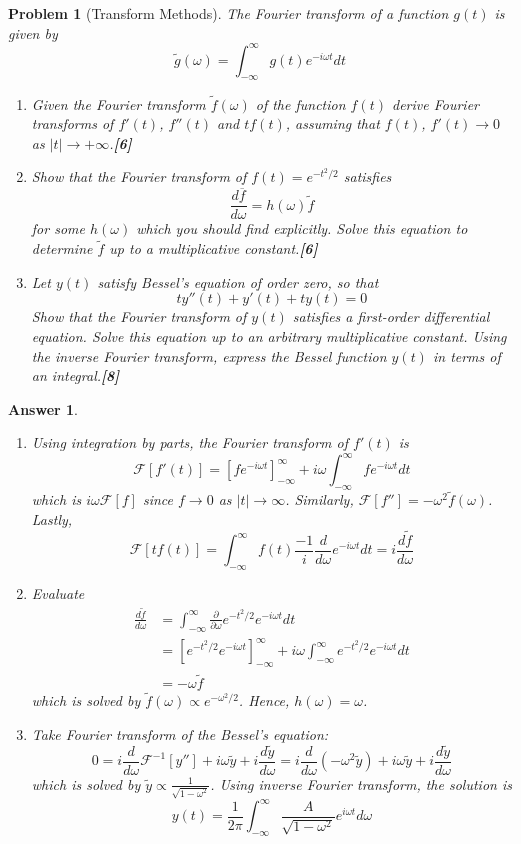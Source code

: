 \documentclass[a4paper]{article}
\newtheorem{ans}{Answer}[section]
\theoremstyle{new}
\newtheorem{qns}{Problem}[section]
\begin{document}
\begin{qns}[Transform Methods]
The Fourier transform of a function $g(t)$ is given by
$$\tilde{g}(\omega)=\int_{-\infty}^\infty g(t)e^{-i\omega t}dt$$
\begin{enumerate}[label=(\alph*)]
\item Given the Fourier transform $\tilde{f}(\omega)$ of the function $f(t)$ derive Fourier transforms of $f'(t)$, $f''(t)$ and $tf(t)$, assuming that $f(t)$, $f'(t)\rightarrow 0$ as $|t|\rightarrow+\infty$.\hfill\textbf{[6]}
\item Show that the Fourier transform of $f(t)=e^{-t^2/2}$ satisfies
$$\frac{d\overline{f}}{d\omega}=h(\omega)\tilde{f}$$
for some $h(\omega)$ which you should find explicitly. Solve this equation to determine $\tilde{f}$ up to a multiplicative constant.\hfill\textbf{[6]}
\item Let $y(t)$ satisfy Bessel’s equation of order zero, so that
$$ty''(t)+y'(t)+ty(t)=0$$
Show that the Fourier transform of $y(t)$ satisfies a first-order differential equation. Solve this equation up to an arbitrary multiplicative constant. Using the inverse Fourier transform, express the Bessel function $y(t)$ in terms of an integral.\hfill\textbf{[8]}
\end{enumerate}
\end{qns}
\begin{ans}\leavevmode
\begin{enumerate}[label=(\alph*)]
\item Using integration by parts, the Fourier transform of $f'(t)$ is
$$\mathcal{F}[f'(t)]=[fe^{-i\omega t}]_{-\infty}^\infty+i\omega\int_{-\infty}^\infty fe^{-i\omega t}dt$$
which is $i\omega\mathcal{F}[f]$ since $f\rightarrow 0$ as $|t|\rightarrow\infty$. Similarly, $\mathcal{F}[f'']=-\omega^2\tilde{f}(\omega)$. Lastly,
$$\mathcal{F}[tf(t)]=\int_{-\infty}^\infty f(t)\frac{-1}{i}\frac{d}{d\omega}e^{-i\omega t}dt=i\frac{d\tilde{f}}{d\omega}$$
\item Evaluate
\begin{align}
    \frac{d\tilde{f}}{d\omega}&=\int_{-\infty}^\infty\frac{\partial}{\partial\omega}e^{-t^2/2}e^{-i\omega t}dt\nonumber\\&=[e^{-t^2/2}e^{-i\omega t}]_{-\infty}^\infty +i\omega\int_{-\infty}^\infty e^{-t^2/2}e^{-i\omega t}dt\nonumber\\&=-\omega\tilde{f}\nonumber
\end{align}
which is solved by $\tilde{f}(\omega)\propto e^{-\omega^2/2}$. Hence, $h(\omega)=\omega$.
\item Take Fourier transform of the Bessel's equation:
$$0=i\frac{d}{d\omega}\mathcal{F}^{-1}[y'']+i\omega\tilde{y}+i\frac{d\tilde{y}}{d\omega}=i\frac{d}{d\omega}(-\omega^2\tilde{y})+i\omega\tilde{y}+i\frac{d\tilde{y}}{d\omega}$$
which is solved by $\tilde{y}\propto\frac{1}{\sqrt{1-\omega^2}}$. Using inverse Fourier transform, the solution is
$$y(t)=\frac{1}{2\pi}\int_{-\infty}^\infty\frac{A}{\sqrt{1-\omega^2}}e^{i\omega t}d\omega$$
\end{enumerate}
\end{ans}
\end{document}

